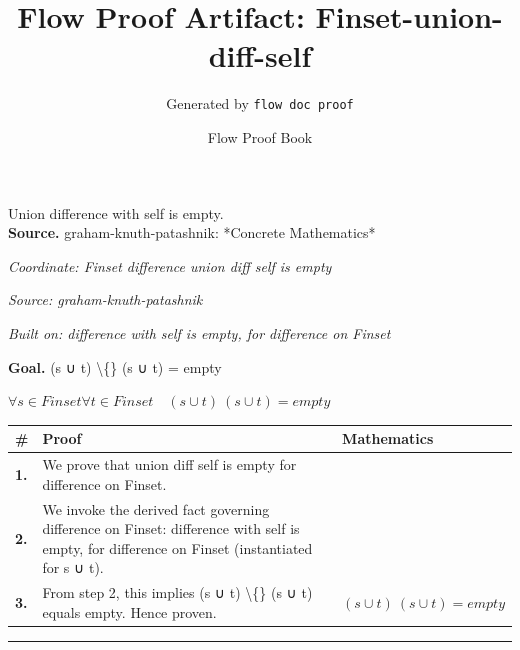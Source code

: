 \documentclass[11pt]{article}
\title{Flow Proof Artifact: Finset-union-diff-self}
\author{Generated by \texttt{flow doc proof}}
\date{Flow Proof Book}
\theoremstyle{definition}
\begin{document}
\maketitle
Union difference with self is empty.\\[0.5em]
\textbf{Source.} graham-knuth-patashnik: *Concrete Mathematics*\\[0.5em]
\bigskip
{}\par
\smallskip\noindent\textit{Coordinate: Finset \cdot difference \cdot union diff self is empty}\par
\smallskip\noindent\textit{Source: graham-knuth-patashnik}\par
\smallskip\noindent\textit{Built on: difference with self is empty, for difference on Finset}\par
\medskip
\noindent\textbf{Goal.} (s ∪ t) \textbackslash\{\} (s ∪ t) = empty\par
\noindent$\displaystyle \forall s \in Finset \forall t \in Finset\quad (s ∪ t) \ (s ∪ t) = empty$\par
\medskip
\noindent
\begin{tabular}{@{} >{\raggedright\arraybackslash}p{} >{\raggedright\arraybackslash}p{} >{\raggedleft\arraybackslash}p{} @{}}
\textbf{\#} & \textbf{Proof} & \textbf{Mathematics} \\
\midrule
\textbf{1.} & We prove that union diff self is empty for difference on Finset. & \\[0.45em]
\textbf{2.} & We invoke the derived fact governing difference on Finset: difference with self is empty, for difference on Finset (instantiated for s ∪ t). & \\[0.45em]
\textbf{3.} & From step 2, this implies (s ∪ t) \textbackslash\{\} (s ∪ t) equals empty. Hence proven. & $\displaystyle (s ∪ t) \ (s ∪ t) = empty$ \\[0.45em]
\bottomrule
\end{tabular}
\label{thm:Finset-difference-union_diff_self_is_empty}
\par\medskip\hrule
\end{document}
